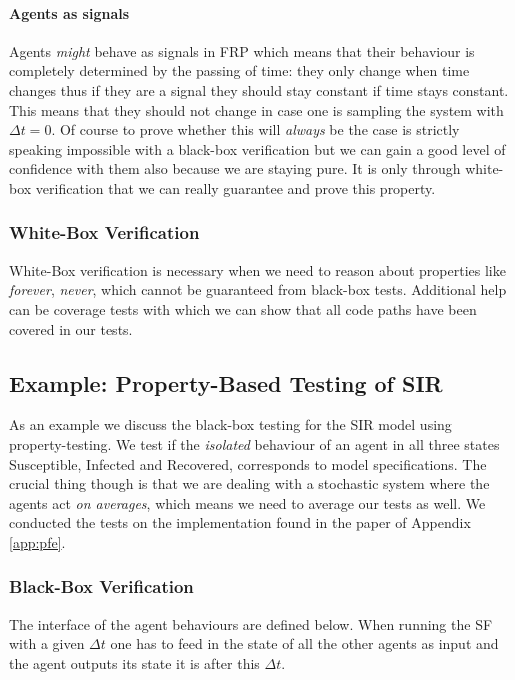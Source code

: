 \paragraph{Agents as signals}
Agents \textit{might} behave as signals in FRP which means that their behaviour is completely determined by the passing of time: they only change when time changes thus if they are a signal they should stay constant if time stays constant. This means that they should not change in case one is sampling the system with $\Delta t = 0$. Of course to prove whether this will \textit{always} be the case is strictly speaking impossible with a black-box verification but we can gain a good level of confidence with them also because we are staying pure. It is only through white-box verification that we can really guarantee and prove this property.

\subsubsection{White-Box Verification}
White-Box verification is necessary when we need to reason about properties like \textit{forever}, \textit{never}, which cannot be guaranteed from black-box tests. Additional help can be coverage tests with which we can show that all code paths have been covered in our tests.

\subsection{Example: Property-Based Testing of SIR}
As an example we discuss the black-box testing for the SIR model using property-testing. We test if the \textit{isolated} behaviour of an agent in all three states Susceptible, Infected and Recovered, corresponds to model specifications. The crucial thing though is that we are dealing with a stochastic system where the agents act \textit{on averages}, which means we need to average our tests as well. We conducted the tests on the implementation found in the paper of Appendix \ref{app:pfe}.

\subsubsection{Black-Box Verification}
The interface of the agent behaviours are defined below. When running the SF with a given $\Delta t$ one has to feed in the state of all the other agents as input and the agent outputs its state it is after this $\Delta t$.

